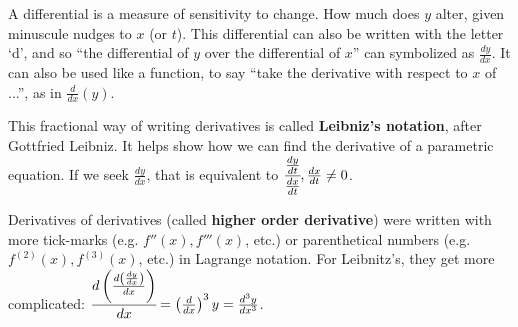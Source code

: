 A differential is a measure of sensitivity to change.  How much does $y$ alter,
given minuscule nudges to $x$ (or $t$).  This differential can also be written with the
letter `d', and so ``the differential of $y$ over the differential of $x$'' can symbolized
as $\frac{dy}{dx}$.  It can also be used like a function, to say ``take the derivative with 
respect to $x$ of ...'', as in $\frac{d}{dx}\left( y\right)$.

This fractional way of writing derivatives is called \textbf{Leibniz's notation}, after
Gottfried Leibniz.  It helps show how we can find the derivative of a parametric equation.
If we seek $\frac{dy}{dx}$, that is equivalent to $\cfrac{\frac{dy}{dt}}{\frac{dx}{dt}}, \frac{dx}{dt}\ne
0$.

Derivatives of derivatives (called \textbf{higher order derivative}) were written 
with more tick-marks (e.g. $f''(x), f'''(x)$, etc.) or parenthetical numbers (e.g. $f^{(2)}(x),
f^{(3)}(x)$, etc.) in Lagrange notation.  For Leibnitz's, they get more complicated:
$\cfrac{d\left(\frac{d\left(\frac{dy}{dx}\right)}{dx}\right)}{dx} = 
\left(\frac{d}{dx}\right)^3y = \frac{d^3y}{dx^3}$.

